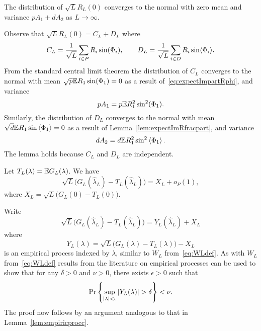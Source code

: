 \documentclass[journal]{IEEEtran}
\begin{document}
\begin{lemma}\label{lem:convdistGLdash}
The distribution of $\sqrt{L}R_L(0)$ converges to the normal with zero mean and variance $pA_1 + dA_2$ as $L\rightarrow\infty$.
\end{lemma}
\begin{IEEEproof}
Observe that $\sqrt{L} R_L(0) = C_L + D_L$ where
\[
C_L = \frac{1}{\sqrt{L}} \sum_{i \in P} R_i \sin(\Phi_i), \qquad D_L = \frac{1}{\sqrt{L}} \sum_{i \in D} R_i \sin\langle \Phi_i \rangle.
\]
From the standard central limit theorem the distribution of $C_L$ converges to the normal with mean $\sqrt{p}{\mathbb E} R_1 \sin(\Phi_1) = 0$ as a result of~\eqref{eq:expectImpartRphi}, and variance
\[
p A_1 = p {\mathbb E} R_1^2 \sin^2(\Phi_1).
\]
Similarly, the distribution of $D_L$ converges to the normal with mean $\sqrt{d}{\mathbb E} R_1 \sin\left\langle \Phi_1 \right\rangle = 0$ as a result of Lemma~\ref{lem:expectImRfracpart}, and variance
\[
d A_2 = d {\mathbb E} R_1^2 \sin^2\left\langle \Phi_1 \right\rangle.
\]
The lemma holds because $C_L$ and $D_L$ are independent. 
\end{IEEEproof}

\begin{lemma}\label{lem:empiricprocforrho} Let $T_L(\lambda) = {\mathbb E} G_L(\lambda)$.  We have
\[
\sqrt{L}\big( G_L(\hat{\lambda}_L) - T_L(\hat{\lambda}_L) \big) =  X_L + o_P(1),
\]
where $X_L = \sqrt{L} \big( G_L(0) - T_L(0) \big)$.
\end{lemma}
\begin{IEEEproof}
Write
\[
\sqrt{L}\big( G_L(\hat{\lambda}_L) - T_L(\hat{\lambda}_L) \big) = Y_L(\hat{\lambda}_L) + X_L
\]
where
\begin{equation}\label{eq:YLdef}
Y_L(\lambda) = \sqrt{L}\big( G_L(\lambda) - T_L(\lambda) \big) - X_L
\end{equation}
is an empirical process indexed by $\lambda$, similar to $W_L$ from~\eqref{eq:WLdef}.  As with $W_L$ from~\eqref{eq:WLdef} results from the literature on empirical processes can be used to show that  
for any $\delta > 0$ and $\nu > 0$, there exists $\epsilon > 0$ such that
\[
\Pr\left\{ \sup_{{\vert \lambda \vert}<\epsilon}{\vert Y_L(\lambda) \vert} > \delta  \right\} < \nu.
\]
The proof now follows by an argument analogous to that in Lemma~\ref{lem:empiricprocc}.
\end{IEEEproof}
\end{document}
